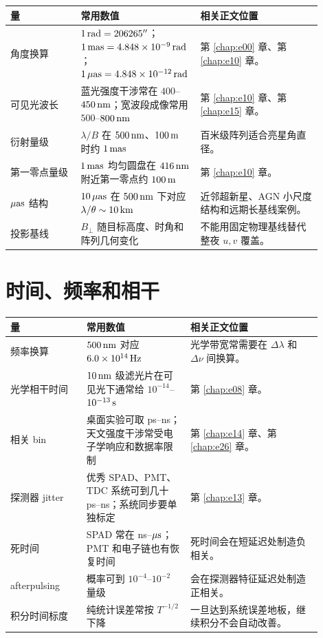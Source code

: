 \begin{longtable}{p{0.22\linewidth}p{0.30\linewidth}p{0.38\linewidth}}
\toprule
量 & 常用数值 & 相关正文位置 \\
\midrule
角度换算 & \(1\,{\rm rad}=206265''\)；\(1\,{\rm mas}=4.848\times10^{-9}\,{\rm rad}\)；\(1\,\mu{\rm as}=4.848\times10^{-12}\,{\rm rad}\) & 第 \ref{chap:e00} 章、第 \ref{chap:e10} 章。 \\
可见光波长 & 蓝光强度干涉常在 \(400\)--\(450\,{\rm nm}\)；宽波段成像常用 \(500\)--\(800\,{\rm nm}\) & 第 \ref{chap:e10} 章、第 \ref{chap:e15} 章。 \\
衍射量级 & \(\lambda/B\) 在 \(500\,{\rm nm}\)、\(100\,{\rm m}\) 时约 \(1\,{\rm mas}\) & 百米级阵列适合亮星角直径。 \\
第一零点量级 & \(1\,{\rm mas}\) 均匀圆盘在 \(416\,{\rm nm}\) 附近第一零点约 \(100\,{\rm m}\) & 第 \ref{chap:e10} 章。 \\
\(\mu{\rm as}\) 结构 & \(10\,\mu{\rm as}\) 在 \(500\,{\rm nm}\) 下对应 \(\lambda/\theta\sim10\,{\rm km}\) & 近邻超新星、AGN 小尺度结构和远期长基线案例。 \\
投影基线 & \(B_\perp\) 随目标高度、时角和阵列几何变化 & 不能用固定物理基线替代整夜 \(u,v\) 覆盖。 \\
\bottomrule
\end{longtable}

\section{时间、频率和相干}
\label{appsec:b-time}

\begin{longtable}{p{0.22\linewidth}p{0.30\linewidth}p{0.38\linewidth}}
\toprule
量 & 常用数值 & 相关正文位置 \\
\midrule
频率换算 & \(500\,{\rm nm}\) 对应 \(6.0\times10^{14}\,{\rm Hz}\) & 光学带宽常需要在 \(\Delta\lambda\) 和 \(\Delta\nu\) 间换算。 \\
光学相干时间 & \(10\,{\rm nm}\) 级滤光片在可见光下通常给 \(10^{-14}\)--\(10^{-13}\,{\rm s}\) & 第 \ref{chap:e08} 章。 \\
相关 bin & 桌面实验可取 ps--ns；天文强度干涉常受电子学响应和数据率限制 & 第 \ref{chap:e14} 章、第 \ref{chap:e26} 章。 \\
探测器 jitter & 优秀 SPAD、PMT、TDC 系统可到几十 ps--ns；系统同步要单独标定 & 第 \ref{chap:e13} 章。 \\
死时间 & SPAD 常在 ns--\(\mu{\rm s}\)；PMT 和电子链也有恢复时间 & 死时间会在短延迟处制造负相关。 \\
afterpulsing & 概率可到 \(10^{-4}\)--\(10^{-2}\) 量级 & 会在探测器特征延迟处制造正相关。 \\
积分时间标度 & 纯统计误差常按 \(T^{-1/2}\) 下降 & 一旦达到系统误差地板，继续积分不会自动改善。 \\
\bottomrule
\end{longtable}

